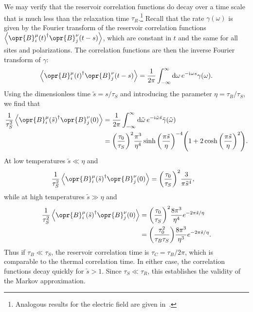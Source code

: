 \documentclass[../thesis.tex]{subfiles}
\begin{document}
We may verify that the reservoir correlation functions do decay over a time
scale that is much less than the relaxation time $\tau_R$.\footnote{%
  Analogous results for the electric field are given in~\cite[p.~574]{opensys}.
}
Recall that the rate $\gamma(\omega)$ is given by the Fourier transform of the
reservoir correlation functions
$\ev{\opr{B}_i^\mu{(t)}^\dag\opr{B}_j^\nu(t-s)}$, which are constant in $t$ and
the same for all sites and polarizations. The correlation functions are then the
inverse Fourier transform of $\gamma$:
\begin{equation}
  \ev{\opr{B}_i^\mu{(t)}^\dag\opr{B}_j^\nu(t-s)}
  = \frac{1}{2\pi}\int_{-\infty}^\infty \dd{\omega} e^{-\im\omega s}
  \gamma(\omega).
\end{equation}
Using the dimensionless time $\tilde{s} = s / \tau_S$ and introducing the
parameter $\eta = \tau_B / \tau_S$, we find that
\begin{align}
  \frac{1}{\tau_S^2}\ev{\opr{B}_i^\mu{(\tilde{s})}^\dag\opr{B}_j^\nu(0)}
  &= \frac{1}{2\pi}\int_{-\infty}^\infty \dd{\tilde{\omega}}
  e^{-\im\tilde{\omega} \tilde{s}}
  \tilde{\gamma}(\tilde{\omega}) \\
  &= {\qty(\frac{\tau_0}{\tau_S})}^2 \frac{\pi^3}{\eta^4}
  \sinh{\qty(\frac{\pi \tilde{s}}{\eta})}^{-4} \qty(%
  1 + 2\cosh{\qty(\frac{\pi\tilde{s}}{\eta})}^2
  ).
\end{align}
At low temperatures $\tilde{s} \ll \eta$ and
\begin{align}
  \frac{1}{\tau_S^2}\ev{\opr{B}_i^\mu{(\tilde{s})}^\dag\opr{B}_j^\nu(0)}
  &= {\qty(\frac{\tau_0}{\tau_S})}^2 \frac{3}{\pi \tilde{s}^4},
\end{align}
while at high temperatures $\tilde{s} \gg \eta$ and
\begin{align}
  \frac{1}{\tau_S^2}\ev{\opr{B}_i^\mu{(\tilde{s})}^\dag\opr{B}_j^\nu(0)}
  &= {\qty(\frac{\tau_0}{\tau_S})}^2 \frac{8\pi^3}{\eta^4}
  e^{-2\pi\tilde{s} / \eta} \\
  &= \qty(\frac{\tau_0^2}{\tau_B \tau_S}) \frac{8\pi^3}{\eta^3}
  e^{-2\pi\tilde{s} / \eta}.
\end{align}
Thus if $\tau_B \ll \tau_S$, the reservoir correlation time is $\tau_C = \tau_B
/ 2\pi$, which is comparable to the thermal correlation time. In either case,
the correlation functions decay quickly for $\tilde{s} > 1$. Since $\tau_S \ll
\tau_R$, this establishes the validity of the Markov approximation.
\end{document}
